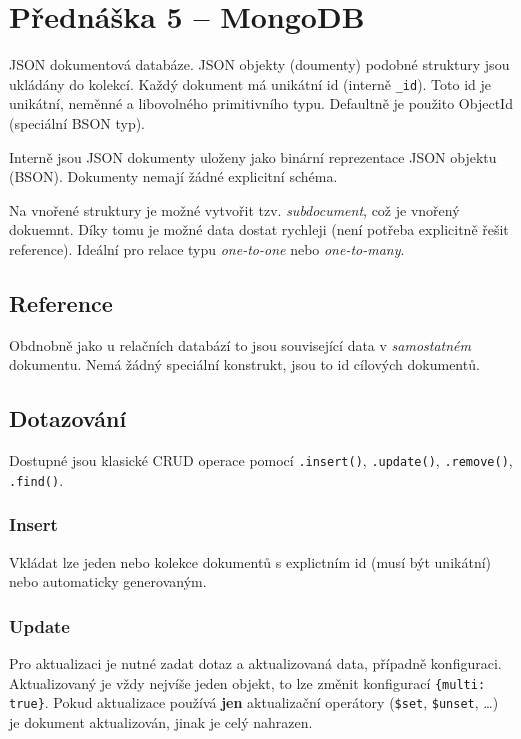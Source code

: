 \section{Přednáška 5 -- MongoDB}

JSON dokumentová databáze.
JSON objekty (doumenty) podobné struktury jsou ukládány do kolekcí.
Každý dokument má unikátní id (interně \texttt{\_id}).
Toto id je unikátní, neměnné a libovolného primitivního typu.
Defaultně je použito ObjectId (speciální BSON typ).

Interně jsou JSON dokumenty uloženy jako binární reprezentace JSON objektu (BSON).
Dokumenty nemají žádné explicitní schéma.

Na vnořené struktury je možné vytvořit tzv. \textit{subdocument}, což je vnořený dokuemnt.
Díky tomu je možné data dostat rychleji (není potřeba explicitně řešit reference).
Ideální pro relace typu \textit{one-to-one} nebo \textit{one-to-many}.

\subsection*{Reference}

Obdnobně jako u relačních databází to jsou související data v \textit{samostatném} dokumentu.
Nemá žádný speciální konstrukt, jsou to id cílových dokumentů.

\subsection*{Dotazování}

Dostupné jsou klasické CRUD operace pomocí \texttt{.insert()}, \texttt{.update()}, \texttt{.remove()}, \texttt{.find()}.

\subsubsection*{Insert}

Vkládat lze jeden nebo kolekce dokumentů s explictním id (musí být unikátní) nebo automaticky generovaným.

\subsubsection*{Update}

Pro aktualizaci je nutné zadat dotaz a aktualizovaná data, případně konfiguraci.
Aktualizovaný je vždy nejvíše jeden objekt, to lze změnit konfigurací \texttt{\{multi: true\}}.
Pokud aktualizace používá \textbf{jen} aktualizační operátory (\texttt{\$set}, \texttt{\$unset}, \dots) je dokument aktualizován, jinak je celý nahrazen.


